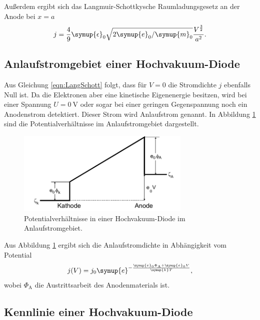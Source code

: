 \FloatBarrier

Außerdem ergibt sich das Langmuir-Schottkysche Raumladungsgesetz an der
Anode bei $x = a$
\begin{align}
  j = \frac{4}{9} \symup{\epsilon}_0
  \sqrt{2 \symup{e}_0/\symup{m}_0} \frac{V^{\frac{3}{2}}}{a^2}.
  \label{eqn:LangSchott}
\end{align}

\subsection{Anlaufstromgebiet einer Hochvakuum-Diode}

Aus Gleichung \eqref{eqn:LangSchott} folgt, dass für $V=0$ die Stromdichte $j$
ebenfalls Null ist.
Da die Elektronen aber eine kinetische Eigenenergie besitzen, wird bei
einer Spannung $U=\SI{0}{\volt}$ oder sogar bei einer geringen Gegenspannung
noch ein Anodenstrom detektiert. Dieser Strom wird Anlaufstrom
genannt. In Abbildung \ref{fig:PotVer} sind die Potentialverhältnisse im
Anlaufstromgebiet dargestellt.

\begin{figure}
  \centering
  \includegraphics[height=4cm]{SommerAlbum15/PotVer.png}
  \caption{Potentialverhältnisse in einer Hochvakuum-Diode im
  Anlaufstromgebiet.\cite{anleitung}}
  \label{fig:PotVer}
\end{figure}

\FloatBarrier

Aus Abbildung \ref{fig:PotVer} ergibt sich die Anlaufstromdichte in Abhängigkeit
vom Potential
\begin{align}
  j(V) = j_0 \symup{e}^{-\frac{\symup{e}_0 \Phi_\text{A}+ \symup{e}_0 V}
  {\symup{k}T}},
  \label{eqn:Anlaufstromst}
\end{align}
wobei $\Phi_\text{A}$ die Austrittsarbeit des Anodenmaterials ist.

\subsection{Kennlinie einer Hochvakuum-Diode}

